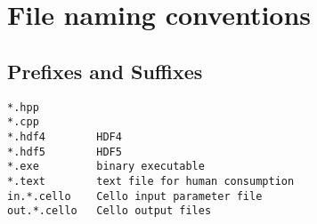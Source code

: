 \documentclass{article}
\begin{document}
\section{File naming conventions}

\subsection{Prefixes and Suffixes}

\begin{verbatim}
*.hpp
*.cpp
*.hdf4        HDF4      
*.hdf5        HDF5      
*.exe         binary executable
*.text        text file for human consumption
in.*.cello    Cello input parameter file
out.*.cello   Cello output files
\end{verbatim}
\end{document}
